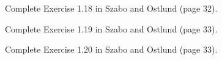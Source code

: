 %

\makeheaderfooter{}
\maketitle

%
\begin{problem1}
Complete Exercise 1.18 in Szabo and Ostlund (page 32).
\end{problem1}

\begin{problem1}
Complete Exercise 1.19 in Szabo and Ostlund (page 33).
\end{problem1}

\begin{problem1}
Complete Exercise 1.20 in Szabo and Ostlund (page 33).
\end{problem1}

%

